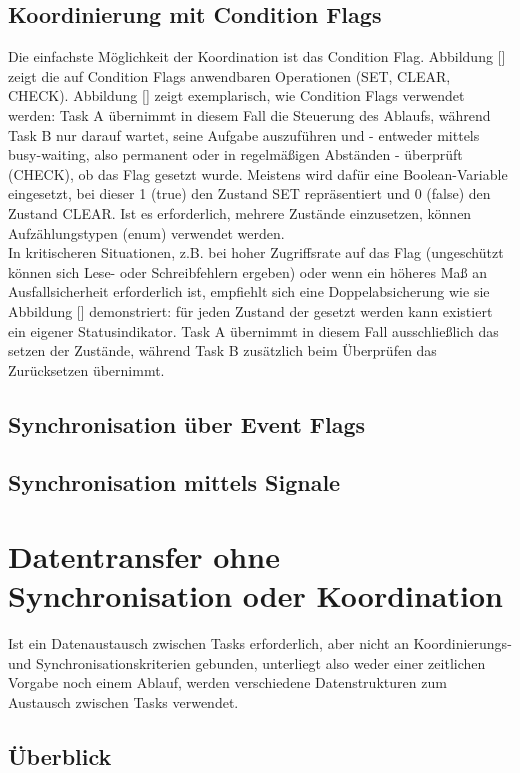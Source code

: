 \documentclass{llncs}
\begin{document}
\subsection{Koordinierung mit Condition Flags}
Die einfachste Möglichkeit der Koordination ist das Condition Flag. Abbildung [] zeigt die auf Condition Flags anwendbaren Operationen (SET, CLEAR, CHECK). Abbildung [] zeigt exemplarisch, wie Condition Flags verwendet werden: Task A übernimmt in diesem Fall die Steuerung des Ablaufs, während Task B nur darauf wartet, seine Aufgabe auszuführen und - entweder mittels busy-waiting, also permanent oder in regelmäßigen Abständen - überprüft (CHECK), ob das Flag gesetzt wurde. Meistens wird dafür eine Boolean-Variable eingesetzt, bei dieser 1 (true) den Zustand SET repräsentiert und 0 (false) den Zustand CLEAR. Ist es erforderlich, mehrere Zustände einzusetzen, können Aufzählungstypen (enum) verwendet werden.\\
In kritischeren Situationen, z.B. bei hoher Zugriffsrate auf das Flag (ungeschützt können sich Lese- oder Schreibfehlern ergeben) oder wenn ein höheres Maß an Ausfallsicherheit erforderlich ist, empfiehlt sich eine Doppelabsicherung wie sie Abbildung [] demonstriert: für jeden Zustand der gesetzt werden kann existiert ein eigener Statusindikator. Task A übernimmt in diesem Fall ausschließlich das setzen der Zustände, während Task B zusätzlich beim Überprüfen das Zurücksetzen übernimmt. 
\subsection{Synchronisation über Event Flags}
\subsection{Synchronisation mittels Signale}
\section{Datentransfer ohne Synchronisation oder Koordination}
Ist ein Datenaustausch zwischen Tasks erforderlich, aber nicht an Koordinierungs- und Synchronisationskriterien gebunden, unterliegt also weder einer zeitlichen Vorgabe noch einem Ablauf, werden verschiedene Datenstrukturen zum Austausch zwischen Tasks verwendet.  
\subsection{Überblick}
\end{document}
